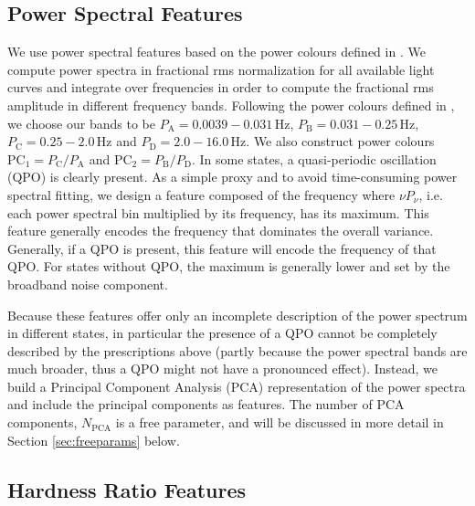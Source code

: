 \documentclass[12pt]{emulateapj}
\begin{document}

\subsection{Power Spectral Features}

We use power spectral features based on the power colours defined in \citep{heil2015}. We compute power spectra in fractional rms normalization for all available light curves and integrate over frequencies in order to compute the fractional rms amplitude in different frequency bands. 
Following the power colours defined in \citet{heil2015}, we choose our bands to be $P_\mathrm{A} = 0.0039-0.031 \,\mathrm{Hz}$, 
$P_\mathrm{B} = 0.031-0.25 \,\mathrm{Hz}$, $P_\mathrm{C} =  0.25-2.0 \,\mathrm{Hz}$ and $P_\mathrm{D} = 2.0-16.0 \,\mathrm{Hz}$. We also construct power colours $\mathrm{PC}_1 = P_\mathrm{C}/P_\mathrm{A}$ and  $\mathrm{PC}_2 = P_\mathrm{B}/P_\mathrm{D}$.
In some states, a quasi-periodic oscillation (QPO) is clearly present. As a simple proxy and to avoid time-consuming power spectral fitting, we design a feature composed of the frequency where $\nu P_\nu$, i.e. each power spectral bin multiplied by its frequency,  has its maximum. This feature generally encodes the frequency that dominates the overall variance. Generally, if a QPO is present, this feature will encode the frequency of that QPO. For states without QPO, the maximum is generally lower and set by the broadband noise component.

Because these features offer only an incomplete description of the power spectrum in different states, in particular the presence of a QPO cannot be completely described by the prescriptions above (partly because the power spectral bands are much broader, thus a QPO might not have a pronounced effect). Instead, we build a Principal Component Analysis (PCA) representation of the power spectra and include the principal components as features. The number of PCA components, $N_\mathrm{PCA}$ is a free parameter, and will be discussed in more detail in Section \ref{sec:freeparams} below. 

\subsection{Hardness Ratio Features}
\end{document}
